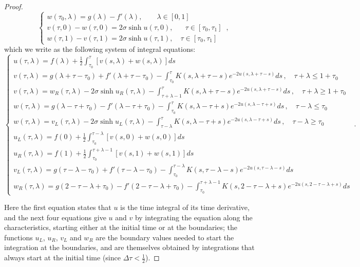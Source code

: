 \documentclass[10pt,a4paper]{amsart}
\newcommand{\lef}{L}
\newcommand{\rig}{R}
\begin{document}
\begin{proof}
\begin{equation}
\begin{cases}
w(\tau_0,\lambda)=g(\lambda) - f'(\lambda), \quad \quad \lambda \in [0,1] \\
v(\tau,0) - w(\tau,0) = 2\sigma \sinh u(\tau,0), \quad \,\,\,\, \tau\in [\tau_0, \tau_1] \\
w(\tau,1) - v(\tau,1) = 2\sigma \sinh u(\tau,1), \quad \tau\in [\tau_0, \tau_1]
\end{cases} \, ,
\end{equation}which we write as the following system of integral equations:
\begin{equation} \label{IBVP4}
\begin{cases}
u(\tau,\lambda) = f(\lambda) + \frac12 \int_{\tau_0}^\tau \left[ v(s,\lambda) + w(s,\lambda) \right] ds \\
v(\tau,\lambda)=g(\lambda + \tau - \tau_0) + f'(\lambda + \tau - \tau_0) - \int_{\tau_0}^\tau K(s,\lambda+\tau-s) e^{- 2u(s,\lambda+\tau-s)} ds \, , \quad \tau + \lambda \leq 1 + \tau_0 \\
v(\tau,\lambda)= w_\rig(\tau, \lambda) - 2 \sigma \sinh u_\rig(\tau,\lambda) - \int_{\tau + \lambda - 1}^\tau K(s,\lambda+\tau-s) e^{- 2u(s,\lambda+\tau-s)} ds \, , \quad \tau + \lambda\geq 1 + \tau_0 \\
w(\tau,\lambda)=g(\lambda - \tau + \tau_0) - f'(\lambda - \tau + \tau_0) - \int_{\tau_0}^\tau K(s,\lambda-\tau+s) e^{- 2u(s,\lambda-\tau+s)} ds \, , \quad \tau - \lambda \leq \tau_0 \\
w(\tau,\lambda)=v_\lef(\tau,\lambda) - 2 \sigma \sinh u_\lef(\tau,\lambda) - \int_{\tau - \lambda}^\tau K(s,\lambda-\tau+s) e^{- 2u(s,\lambda-\tau+s)} ds \, , \quad \tau - \lambda \geq \tau_0 \\
u_\lef(\tau,\lambda) = f(0) + \frac12 \int_{\tau_0}^{\tau-\lambda} \left[ v(s,0) + w(s,0) \right] ds \\
u_\rig(\tau,\lambda) = f(1) + \frac12 \int_{\tau_0}^{\tau+\lambda-1} \left[ v(s,1) + w(s,1) \right] ds \\
v_\lef(\tau,\lambda)=g(\tau - \lambda - \tau_0) + f'(\tau - \lambda - \tau_0) - \int_{\tau_0}^{\tau-\lambda} K(s,\tau-\lambda-s) e^{- 2u(s,\tau-\lambda-s)} ds \\
w_\rig(\tau,\lambda)=g(2 - \tau - \lambda + \tau_0) - f'(2 - \tau - \lambda + \tau_0) - \int_{\tau_0}^{\tau+\lambda-1} K(s,2 - \tau - \lambda+s) e^{- 2u(s,2 - \tau - \lambda+s)} ds
\end{cases} \, .
\end{equation}

Here the first equation states that $u$ is the time integral of its time derivative, and the next four equations give $u$ and $v$ by integrating the equation along the characteristics, starting either at the initial time or at the boundaries; the functions $u_\lef$, $u_\rig$, $v_\lef$ and $w_\rig$ are the boundary values needed to start the integration at the boundaries, and are themselves obtained by integrations that always start at the initial time (since $\Delta \tau < \frac12$).


\end{proof}
\end{document}
